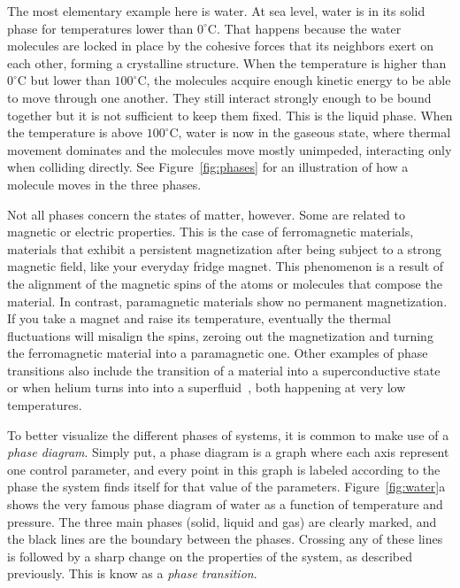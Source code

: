 The most elementary example here is water. At sea level, water is in its solid
phase for temperatures lower than $0^\circ$C. That happens because the water
molecules are locked in place by the cohesive forces that its neighbors exert
on each other, forming a crystalline structure. When the temperature is higher
than $0^\circ$C but lower than $100^\circ$C, the molecules acquire enough
kinetic energy to be able to move through one another. They still interact
strongly enough to be bound together but it is not sufficient to keep them
fixed. This is the liquid phase. When the temperature is above $100^\circ$C,
water is now in the gaseous state, where thermal movement dominates and the
molecules move mostly unimpeded, interacting only when colliding directly. See
Figure~\ref{fig:phases} for an illustration of how a molecule moves in the
three phases.

Not all phases concern the states of matter, however. Some are related to
magnetic or electric properties. This is the case of ferromagnetic materials,
materials that exhibit a persistent magnetization after being subject to a
strong magnetic field, like your everyday fridge magnet. This phenomenon is a
result of the alignment of the magnetic spins of the atoms or molecules that
compose the material. In contrast, paramagnetic materials show no permanent
magnetization. If you take a magnet and raise its temperature, eventually the
thermal fluctuations will misalign the spins, zeroing out the magnetization and
turning the ferromagnetic material into a paramagnetic one. Other examples of
phase transitions also include the transition of a material into a
superconductive state~\cite{Fisher1991} or when helium turns into into a
superfluid~\cite{Campostrini2006}, both happening at very low temperatures.

To better visualize the different phases of systems, it is common to make use
of a \textit{phase diagram}. Simply put, a phase diagram is a graph where each
axis represent one control parameter, and every point in this graph is labeled
according to the phase the system finds itself for that value of the
parameters. Figure~\ref{fig:water}a shows the very famous phase diagram of
water as a function of temperature and pressure. The three main phases (solid,
liquid and gas) are clearly marked, and the black lines are the boundary
between the phases. Crossing any of these lines is followed by a sharp change
on the properties of the system, as described previously. This is know as a
\textit{phase transition}.

